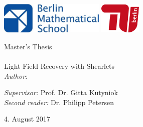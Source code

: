 \documentclass[11pt, english, singlespacing, headsepline, ]{MastersDoctoralThesis}
\author{Héctor Andrade Loarca} %
\theoremstyle{definition}
\begin{document}
\frontmatter %

\pagestyle{plain} %


\begin{titlepage}
\centering\includegraphics*[width=5cm]{bms-logo.jpg} \vspace{50pt}\includegraphics*[width=2cm]{tu-logo.jpg} \\

\begin{center}

{\LARGE \univname\par}\vspace{1.5cm} %
\Large Master's Thesis\\[0.5cm] %

\HRule \\[0.4cm] %
\huge
Light Field Recovery with Shearlets
\vspace{0.4cm} %
\HRule \\[1.5cm] %
 \normalsize
\emph{Author:}\\
{\authorname} %


\vspace{4cm}

\begin{flushleft} 
\emph{Supervisor:} Prof. Dr. Gitta Kutyniok\\
\emph{Second reader:} Dr. Philipp Petersen\\
\end{flushleft} 


\vspace{1cm}
 \facname

{\large 4. August 2017}\\[4cm] %
 
\vfill
\end{center}
\end{titlepage}
\end{document}

